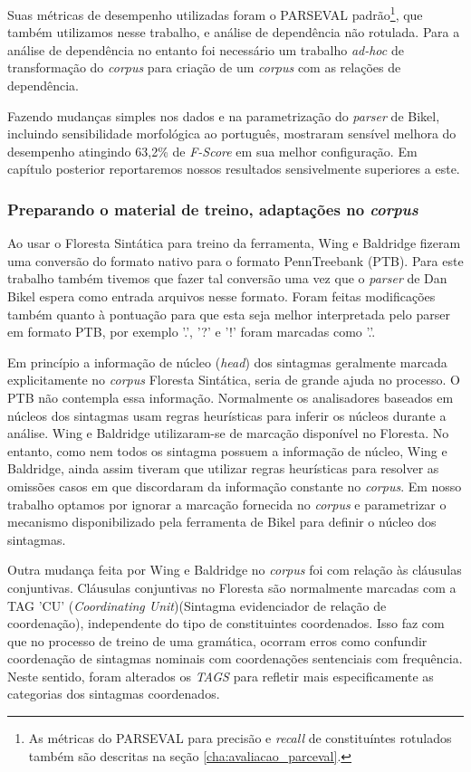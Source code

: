 Suas métricas de desempenho utilizadas foram o PARSEVAL padrão\footnote{As métricas do PARSEVAL para precisão e \emph{recall} de constituíntes rotulados também são descritas na seção \ref{cha:avaliacao_parceval}.}, que também utilizamos nesse trabalho, e análise de dependência não rotulada. Para a análise de dependência no entanto foi necessário um trabalho \emph{ad-hoc} de transformação do \emph{corpus} para criação de um \emph{corpus} com as relações de dependência.

Fazendo mudanças simples nos dados e na parametrização do \emph{parser} de Bikel, incluindo sensibilidade morfológica ao português, mostraram sensível melhora do desempenho atingindo 63,2{\%} de \emph{F-Score} em sua melhor configuração. Em capítulo posterior reportaremos nossos resultados sensivelmente superiores a este.

\subsubsection{Preparando o material de treino, adaptações no \emph{corpus}} %
\label{sec:wing_baldridge_adapt_corpus}

Ao usar o Floresta Sintática para treino da ferramenta, Wing e Baldridge fizeram uma conversão do formato nativo para o formato PennTreebank (PTB). Para este trabalho também tivemos que fazer tal conversão uma vez que o \emph{parser} de Dan Bikel espera como entrada arquivos nesse formato. Foram feitas modificações também quanto à pontuação para que esta seja melhor interpretada pelo parser em formato PTB, por exemplo '.', '?' e '!' foram marcadas como '.'. 

Em princípio a informação de núcleo (\emph{head}) dos sintagmas geralmente marcada explicitamente no \emph{corpus} Floresta Sintática, seria de grande ajuda no processo. O PTB não contempla essa informação. Normalmente os analisadores baseados em núcleos dos sintagmas usam regras heurísticas para inferir os núcleos durante a análise. Wing e Baldridge utilizaram-se de marcação disponível no Floresta. No entanto, como nem todos os sintagma possuem a informação de núcleo, Wing e Baldridge, ainda assim tiveram que utilizar regras heurísticas para resolver as omissões casos em que discordaram da informação constante no \emph{corpus}. Em nosso trabalho optamos por ignorar a marcação fornecida no \emph{corpus} e parametrizar o mecanismo disponibilizado pela ferramenta de Bikel para definir o núcleo dos sintagmas.

Outra mudança feita por Wing e Baldridge no \emph{corpus} foi com relação às cláusulas conjuntivas. Cláusulas conjuntivas no Floresta são normalmente marcadas com a TAG 'CU' (\emph{Coordinating Unit})(Sintagma evidenciador de relação de coordenação), independente do tipo de constituintes coordenados. Isso faz com que no processo de treino de uma gramática, ocorram erros como confundir coordenação de sintagmas nominais com coordenações sentenciais com frequência. Neste sentido, foram alterados os \emph{TAGS} para refletir mais especificamente as categorias dos sintagmas coordenados.

